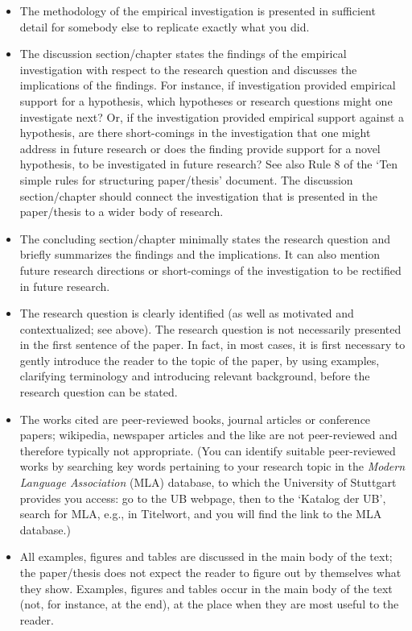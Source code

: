 \documentclass[11pt,fleqn,a4paper/thesis]{article}
\newcommand{\6}{\mbox{$[\hspace*{-.6mm}[$}}
\newcommand{\9}{\mbox{$]\hspace*{-.6mm}]$}}
\begin{document}
\begin{itemize}[itemsep=-1pt,leftmargin=2.5ex,topsep=-2pt]
\item The methodology of the empirical investigation is presented in sufficient detail for somebody else to replicate exactly what you did.

\item The discussion section/chapter states the findings of the empirical investigation with respect to the research question and discusses the implications of the findings. For instance, if investigation provided empirical support for a hypothesis, which hypotheses or research questions might one investigate next? Or, if the investigation provided empirical support against a hypothesis, are there short-comings in the investigation that one might address in future research or does the finding provide support for a novel hypothesis, to be investigated in future research? See also Rule 8 of the `Ten simple rules for structuring paper/thesis' document. The discussion section/chapter should connect the investigation that is presented in the paper/thesis to a wider body of research.

\item The concluding section/chapter minimally states the research question and briefly summarizes the findings and the implications. It can also mention future research directions or short-comings of the investigation to be rectified in future research. 

\item The research question is clearly identified (as well as motivated and contextualized; see above). The research question is not necessarily presented in the first sentence of the paper. In fact, in most cases, it is first necessary to gently introduce the reader to the topic of the paper, by using examples, clarifying terminology and introducing relevant background, before the research question can be stated.

\item The works cited are peer-reviewed books, journal articles or conference papers; wikipedia, newspaper articles and the like are not peer-reviewed and therefore typically not appropriate. (You can identify suitable peer-reviewed works by searching key words pertaining to your research topic in the {\em Modern Language Association} (MLA) database, to which the University of Stuttgart provides you access: go to the UB webpage, then to the `Katalog  der UB', search for MLA, e.g., in Titelwort, and you will find the link to the MLA database.)

\item All examples, figures and tables are discussed in the main body of the text; the paper/thesis does not expect the reader to figure out by themselves what they show. Examples, figures and tables occur in the main body of the text (not, for instance, at the end), at the place when they are most useful to the reader.


\end{itemize}
\end{document}
